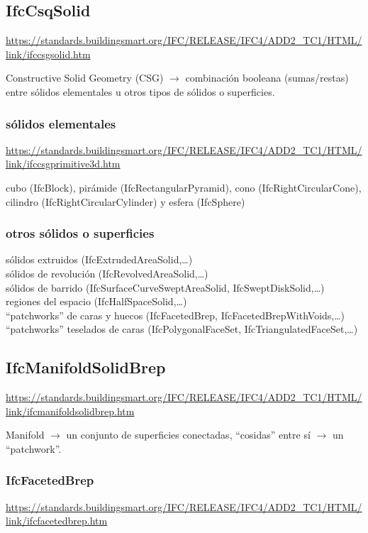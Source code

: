 \documentclass[spanish,12pt,a4paper,final,oneside]{book}
\begin{document}
\subsection{IfcCsqSolid}
\url{https://standards.buildingsmart.org/IFC/RELEASE/IFC4/ADD2_TC1/HTML/link/ifccsgsolid.htm}

Constructive Solid Geometry (CSG) $\rightarrow$ combinación booleana (sumas/restas) entre sólidos elementales u otros tipos de sólidos o superficies. 

\subsubsection{sólidos elementales}
\url{https://standards.buildingsmart.org/IFC/RELEASE/IFC4/ADD2_TC1/HTML/link/ifccsgprimitive3d.htm}

cubo (IfcBlock), pirámide (IfcRectangularPyramid), cono (IfcRightCircularCone), cilindro (IfcRightCircularCylinder) y esfera (IfcSphere)

\subsubsection{otros sólidos o superficies}
sólidos extruidos (IfcExtrudedAreaSolid,\ldots)
\\sólidos de revolución (IfcRevolvedAreaSolid,\ldots)
\\sólidos de barrido (IfcSurfaceCurveSweptAreaSolid, IfcSweptDiskSolid,\ldots)
\\regiones del espacio (IfcHalfSpaceSolid,\ldots)
\\``patchworks'' de caras y huecos (IfcFacetedBrep, IfcFacetedBrepWithVoids,\ldots)
\\``patchworks'' teselados de caras (IfcPolygonalFaceSet, IfcTriangulatedFaceSet,\ldots)


\subsection{IfcManifoldSolidBrep}
\url{https://standards.buildingsmart.org/IFC/RELEASE/IFC4/ADD2_TC1/HTML/link/ifcmanifoldsolidbrep.htm}

Manifold $\rightarrow$ un conjunto de superficies conectadas, ``cosidas'' entre sí $\rightarrow$ un ``patchwork''.

\subsubsection{IfcFacetedBrep}
\url{https://standards.buildingsmart.org/IFC/RELEASE/IFC4/ADD2_TC1/HTML/link/ifcfacetedbrep.htm}
\end{document}
